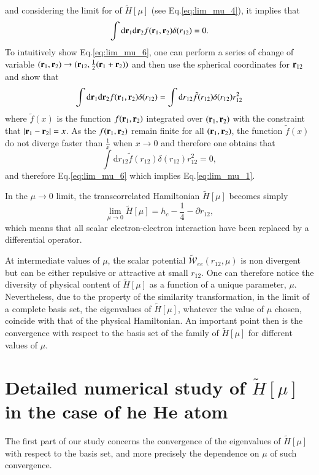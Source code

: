 \documentclass[aip,jcp,reprint,noshowkeys,superscriptaddress]{revtex4-1}
\newcommand{\br}[0]{{\bf {r}}}
\begin{document}
and considering the limit for of $\tilde{H}[\mu]$ (see Eq.\eqref{eq:lim_mu_4}), it implies that 
\begin{equation}
 \label{eq:lim_mu_6}
 \int \text{d}\br{}_1 \text{d}\br{}_2 f(\br{}_1,\br{}_2) \delta(r_{12}) = 0.
\end{equation}
To intuitively show Eq.\eqref{eq:lim_mu_6}, one can perform a series of change of variable $(\br{}_1,\br{}_2)\rightarrow (\br{}_{12},\frac{1}{2}(\br{}_1 + \br{}_2))$ and then use the spherical coordinates for $\br{}_{12}$ and show that 
\begin{equation}
 \int \text{d}\br{}_1 \text{d}\br{}_2 f(\br{}_1,\br{}_2) \delta(r_{12}) = \int \text{d}r{}_{12}  \tilde{f}(r_{12}) \delta(r_{12}) r_{12}^2 
\end{equation}
where $\tilde{f}(x)$ is the function $f(\br{}_1,\br{}_2)$ integrated over $(\br{}_1,\br{}_2)$ with the constraint that 
$|\br{}_1-\br{}_2| = x$. 
As the $f(\br{}_1,\br{}_2)$ remain finite for all $(\br{}_1,\br{}_2)$, the function $\tilde{f}(x)$ 
do not diverge faster than $\frac{1}{x}$ when $x\rightarrow 0$ and therefore one obtains that 
\begin{equation}
 \int \text{d}r{}_{12}  \tilde{f}(r_{12}) \delta(r_{12}) r_{12}^2 = 0,
\end{equation}
and therefore Eq.\eqref{eq:lim_mu_6} which implies Eq.\eqref{eq:lim_mu_1}. 

In the $\mu \rightarrow 0$ limit, the transcorrelated Hamiltonian $\tilde{H}[\mu]$ becomes simply 
\begin{equation}
 \lim_{\mu \rightarrow 0} \tilde{H}[\mu] = h_c - \frac{1}{4} - \partial{}{r_{12}}{}, 
\end{equation}
which means that all scalar electron-electron interaction have been replaced by a differential operator. 

At intermediate values of $\mu$, the scalar potential $\tilde{\mathcal{W}}_{ee}(r_{12},\mu) $ is non divergent but can be either repulsive or attractive at small $r_{12}$. One can therefore notice the diversity of physical content of $\tilde{H}[\mu]$ as a function of a unique parameter, $\mu$. 
Nevertheless, due to the property of the similarity transformation, in the limit of a complete basis set, the eigenvalues of $\tilde{H}[\mu]$, whatever the value of $\mu$ chosen, coincide with that of the physical Hamiltonian. An important point then is the convergence with respect to the basis set of the family of $\tilde{H}[\mu]$ for different values of $\mu$.  

\section{Detailed numerical study of $\tilde{H}[\mu]$ in the case of he He atom}
The first part of our study concerns the convergence of the eigenvalues of $\tilde{H}[\mu]$ with respect to the basis set, and more precisely the dependence on $\mu$ of such convergence. 
\end{document}
